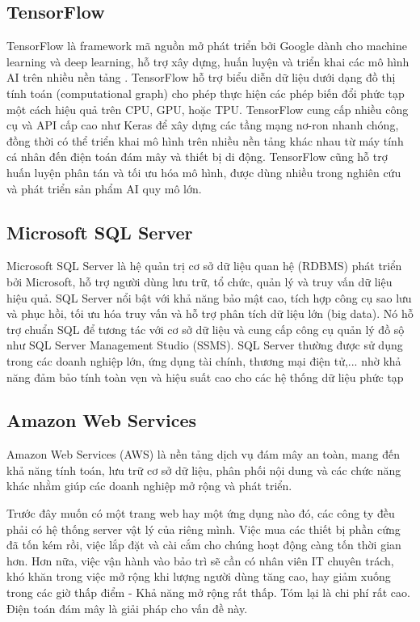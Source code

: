 \documentclass[../DoAn.tex]{subfiles}
\begin{document}
\subsection{TensorFlow}
TensorFlow là framework mã nguồn mở phát triển bởi Google dành cho machine learning và deep learning, hỗ trợ xây dựng, huấn luyện và triển khai các mô hình AI trên nhiều nền tảng \cite{tensorflowTensorFlow}. TensorFlow hỗ trợ biểu diễn dữ liệu dưới dạng đồ thị tính toán (computational graph) cho phép thực hiện các phép biến đổi phức tạp một cách hiệu quả trên CPU, GPU, hoặc TPU. TensorFlow cung cấp nhiều công cụ và API cấp cao như Keras để xây dựng các tầng mạng nơ-ron nhanh chóng, đồng thời có thể triển khai mô hình trên nhiều nền tảng khác nhau từ máy tính cá nhân đến điện toán đám mây và thiết bị di động. TensorFlow cũng hỗ trợ huấn luyện phân tán và tối ưu hóa mô hình, được dùng nhiều trong nghiên cứu và phát triển sản phẩm AI quy mô lớn.
\subsection{Microsoft SQL Server}
Microsoft SQL Server là hệ quản trị cơ sở dữ liệu quan hệ (RDBMS) phát triển bởi Microsoft, hỗ trợ người dùng lưu trữ, tổ chức, quản lý và truy vấn dữ liệu hiệu quả. SQL Server nổi bật với khả năng bảo mật cao, tích hợp công cụ sao lưu và phục hồi, tối ưu hóa truy vấn và hỗ trợ phân tích dữ liệu lớn (big data). Nó hỗ trợ chuẩn SQL để tương tác với cơ sở dữ liệu và cung cấp công cụ quản lý đồ sộ như SQL Server Management Studio (SSMS). SQL Server thường được sử dụng trong các doanh nghiệp lớn, ứng dụng tài chính, thương mại điện tử,... nhờ khả năng đảm bảo tính toàn vẹn và hiệu suất cao cho các hệ thống dữ liệu phức tạp \cite{wikipediaMicrosoftServer}
\subsection{Amazon Web Services}
Amazon Web Services (AWS) \cite{kewate2022review} là nền tảng dịch vụ đám mây an toàn, mang đến khả năng tính toán, lưu trữ cơ sở dữ liệu, phân phối nội dung và các chức năng khác nhằm giúp các doanh nghiệp mở rộng và phát triển.

Trước đây muốn có một trang web hay một ứng dụng nào đó, các công ty đều phải có hệ thống server vật lý của riêng mình. Việc mua các thiết bị phần cứng đã tốn kém rồi, việc lắp đặt và cài cắm cho chúng hoạt động càng tốn thời gian hơn. Hơn nữa, việc vận hành vào bảo trì sẽ cần có nhân viên IT chuyên trách, khó khăn trong việc mở rộng khi lượng người dùng tăng cao, hay giảm xuống trong các giờ thấp điểm - Khả năng mở rộng rất thấp. Tóm lại là chi phí rất cao. Điện toán đám mây là giải pháp cho vấn đề này.
\end{document}
